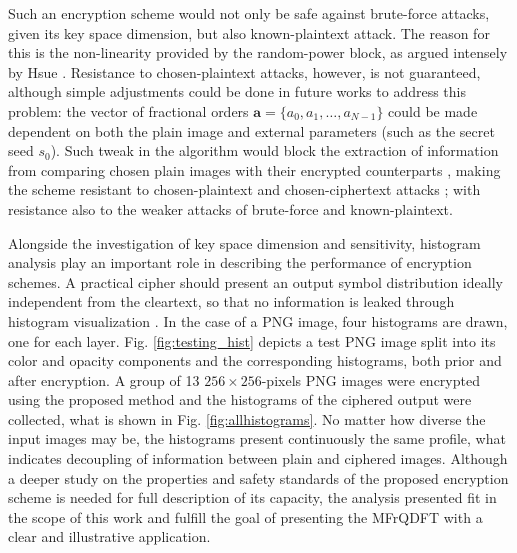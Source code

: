 Such an encryption scheme would not only be safe against brute-force attacks, given its key space dimension, but also known-plaintext attack. The reason for this is the non-linearity provided by the random-power block, as argued intensely by Hsue \cite{hsue2018enhancing}. Resistance to chosen-plaintext attacks, however, is not guaranteed, although simple adjustments could be done in future works to address this problem: the vector of fractional orders $ \mathbf{a} = \{ a_0, a_1, \dots, a_{N-1} \} $ could be made dependent on both the plain image and external parameters (such as the secret seed $ s_0 $). Such tweak in the algorithm would block the extraction of information from comparing chosen plain images with their encrypted counterparts \cite{chai2019color, hu2017chaotic, murugan2016image}, making the scheme resistant to chosen-plaintext and chosen-ciphertext attacks \cite{wang2012novel}; with resistance also to the weaker attacks of brute-force and known-plaintext.

Alongside the investigation of key space dimension and sensitivity, histogram analysis play an important role in describing the performance of encryption schemes. A practical cipher should present an output symbol distribution ideally independent from the cleartext, so that no information is leaked through histogram visualization  \cite{zhang2014symmetric}.
In the case of a PNG image, four histograms are drawn, one for each layer. Fig. \ref{fig:testing_hist} depicts a test PNG image split into its color and opacity components and the corresponding histograms, both prior and after encryption. A group of 13 $ 256\times 256 $-pixels PNG images were encrypted using the proposed method and the histograms of the ciphered output were collected, what is shown in Fig. \ref{fig:allhistograms}. No matter how diverse the input images may be, the histograms present continuously the same profile, what indicates decoupling of information between plain and ciphered images. Although a deeper study on the properties and safety standards of the proposed encryption scheme is needed for full description of its capacity, the analysis presented fit in the scope of this work and fulfill the goal of presenting the MFrQDFT with a clear and illustrative application.

